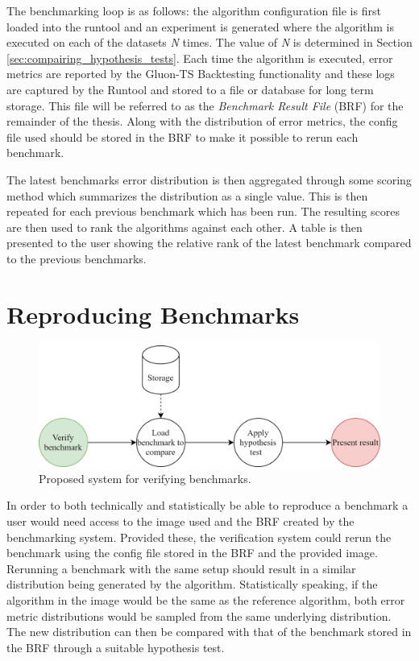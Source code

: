 The benchmarking loop is as follows: the algorithm configuration file is first loaded into the runtool and an experiment is generated where the algorithm is executed on each of the datasets \textit{N} times. The value of \textit{N} is determined in Section \ref{sec:compairing_hypothesis_tests}. Each time the algorithm is executed, error metrics are reported by the Gluon-TS Backtesting functionality and these logs are captured by the Runtool and stored to a file or database for long term storage. This file will be referred to as the \textit{Benchmark Result File} (BRF) for the remainder of the thesis. Along with the distribution of error metrics, the config file used should be stored in the BRF to make it possible to rerun each benchmark.

The latest benchmarks error distribution is then aggregated through some scoring method which summarizes the distribution as a single value. This is then repeated for each previous benchmark which has been run. The resulting scores are then used to rank the algorithms against each other. A table is then presented to the user showing the relative rank of the latest benchmark compared to the previous benchmarks.

\section{Reproducing Benchmarks}
\label{sec:reproduce_benchmarks}
\begin{figure}[h]
  \centering
  \includegraphics[width=\linewidth]{./img/verify_benchmark.png}
  \caption{Proposed system for verifying benchmarks.}
  \label{fig:proposed_validation_system}
\end{figure}

In order to both technically and statistically be able to reproduce a benchmark a user would need access to the image used and the BRF created by the benchmarking system. Provided these, the verification system could rerun the benchmark using the config file stored in the BRF and the provided image. Rerunning a benchmark with the same setup should result in a similar distribution being generated by the algorithm. Statistically speaking, if the algorithm in the image would be the same as the reference algorithm, both error metric distributions would be sampled from the same underlying distribution. The new distribution can then be compared with that of the benchmark stored in the BRF through a suitable hypothesis test.

